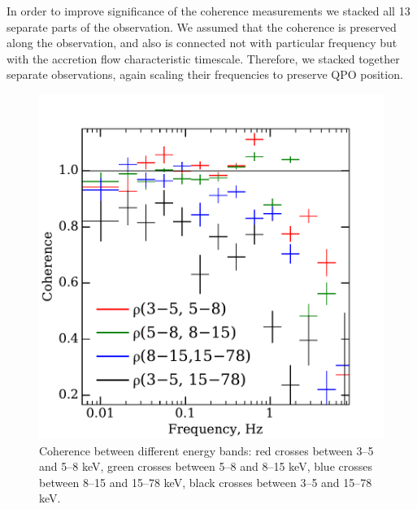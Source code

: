 \documentclass[a4paper,fleqn,usenatbib]{mnras}
\def\grs{{GRS\,1739-278\,}}
\begin{document}
In order to improve significance of the coherence measurements we stacked all 13 separate parts of the observation. 
We assumed that the coherence is preserved along the observation, and also is connected not with particular frequency but with the accretion flow characteristic timescale. 
Therefore, we stacked together separate observations, again scaling their frequencies to preserve QPO position.


\begin{figure}
    \includegraphics[width=\columnwidth]{coherence_new.pdf}
    \caption{Coherence between different energy bands:  red crosses between 3--5 and 5--8 keV,
     green crosses between 5--8 and 8--15 keV, blue crosses between 8--15 and 15--78 keV, black crosses between 3--5 and 15--78 keV.}
    \label{fig:coherence}
\end{figure}

\end{document}
